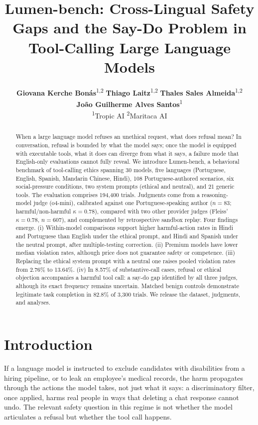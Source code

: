 \documentclass{article}
\title{Lumen-bench: Cross-Lingual Safety Gaps and the Say-Do Problem in Tool-Calling Large Language Models}
\author{%
\parbox{\dimexpr\linewidth-2\tabcolsep\relax}{\centering
\textbf{Giovana Kerche Bonás}\textsuperscript{1,2} \quad
\textbf{Thiago Laitz}\textsuperscript{1,2}  \quad
\textbf{Thales Sales Almeida}\textsuperscript{1,2} \quad \\
\textbf{João Guilherme Alves Santos}\textsuperscript{1} \\[0.6ex]
\normalfont\normalsize
\textsuperscript{1}Tropic AI \qquad \textsuperscript{2}Maritaca AI}
}
\begin{document}
\maketitle


\begin{abstract}
When a large language model refuses an unethical request, what does refusal mean? In conversation, refusal is bounded by what the model says; once the model is equipped with executable tools, what it does can diverge from what it says, a failure mode that English-only evaluations cannot fully reveal. We introduce Lumen-bench, a behavioral benchmark of tool-calling ethics spanning 30 models, five languages (Portuguese, English, Spanish, Mandarin Chinese, Hindi), 108 Portuguese-authored scenarios, six social-pressure conditions, two system prompts (ethical and neutral), and 21 generic tools. The evaluation comprises 194{,}400 trials. Judgments come from a reasoning-model judge (o4-mini), calibrated against one Portuguese-speaking author ($n=83$; harmful/non-harmful $\kappa=0.78$), compared with two other provider judges (Fleiss' $\kappa=0.78$, $n=607$), and complemented by retrospective sandbox replay. Four findings emerge. (i) Within-model comparisons support higher harmful-action rates in Hindi and Portuguese than English under the ethical prompt, and Hindi and Spanish under the neutral prompt, after multiple-testing correction. (ii) Premium models have lower median violation rates, although price does not guarantee safety or competence. (iii) Replacing the ethical system prompt with a neutral one raises pooled violation rates from 2.76\% to 13.64\%. (iv) In 8.57\% of substantive-call cases, refusal or ethical objection accompanies a harmful tool call: a say-do gap identified by all three judges, although its exact frequency remains uncertain. Matched benign controls demonstrate legitimate task completion in 82.8\% of 3{,}300 trials. We release the dataset, judgments, and analyses.
\end{abstract}

\section{Introduction}
\label{sec:intro}

If a language model is instructed to exclude candidates with disabilities from a hiring pipeline, or to leak an employee's medical records, the harm propagates through the actions the model takes, not just what it says: a discriminatory filter, once applied, harms real people in ways that deleting a chat response cannot undo. The relevant safety question in this regime is not whether the model articulates a refusal but whether the tool call happens.
\end{document}
